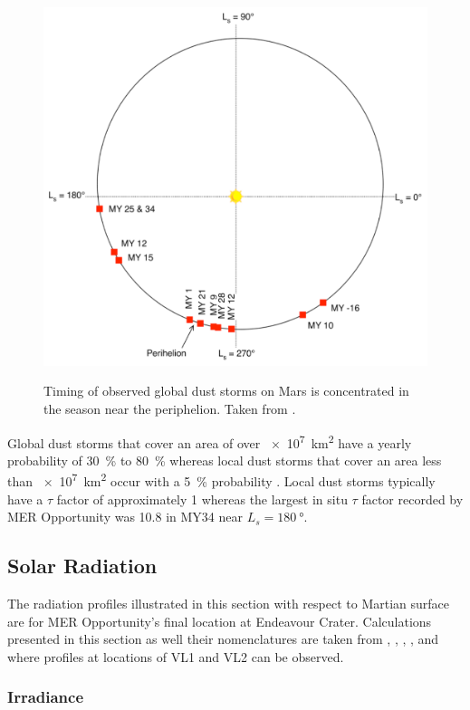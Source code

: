 \begin{figure}[h]
  \centering
  \hypersetup{linkcolor=captionTextColor}
  \includegraphics[width=0.4\linewidth]{sections/mars-solar-energy/solar-radiation/images/timin-of-observed-global-dust-storms.png}\\
  \caption[Timing of observed global dust storms on Mars]
          {Timing of observed global dust storms on Mars is concentrated in the season near the periphelion. Taken from .}
  \label{fig:image:global-dust-storm-timing}
\end{figure}

Global dust storms that cover an area of over \SI{e7}{\kilo\meter\squared} have a yearly probability of \SI{30}{\percent} to \SI{80}{\percent} whereas local dust storms that cover an area less than \SI{e7}{\kilo\meter\squared} occur with a \SI{5}{\percent} probability . Local dust storms typically have a $\tau$ factor of approximately 1  whereas the largest in situ $\tau$ factor recorded by \ac{MER} Opportunity was 10.8 in \ac{MY}34 near $L_{s} = \SI{180}{\degree}$.


\subsection{Solar Radiation}
\label{sec:MartianEnvironment:SolarRadiation}


The radiation profiles illustrated in this section with respect to Martian surface are for MER Opportunity's final location at Endeavour Crater. Calculations presented in this section as well their nomenclatures are taken from , , , , and  where profiles at locations of \ac{VL1} and \ac{VL2} can be observed.

\subsubsection{Irradiance}
\label{sec:MartianEnvironment:SolarRadiation:Irradiance}


